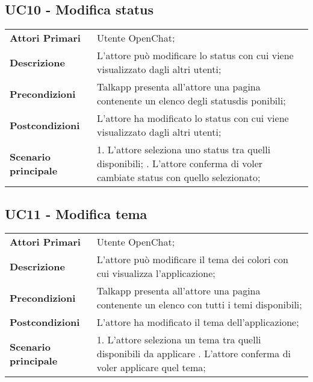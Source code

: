 \subsection{UC10 - Modifica status}
	\begin{center}
	\bgroup
	\def\arraystretch{1.8}     
	\begin{longtable}{  p{4cm} | p{9.5cm} } 
		\textbf{Attori Primari} & Utente OpenChat; \\ 
		\textbf{Descrizione} &  L'attore può modificare lo status con cui viene visualizzato dagli altri utenti; \\ 
		\textbf{Precondizioni}  & Talkapp presenta all'attore una pagina contenente un elenco degli statusdis ponibili; \\
		\textbf{Postcondizioni} & L'attore ha modificato lo status con cui viene visualizzato dagli altri utenti; \\ 
		\textbf{Scenario principale} & 
		1. L'attore seleziona uno status tra quelli disponibili; \newline
		2. L'attore conferma di voler cambiate status con quello selezionato;
	\end{longtable}
	\egroup
\end{center}

\subsection{UC11 - Modifica tema}
	\begin{center}
	\bgroup
	\def\arraystretch{1.8}     
	\begin{longtable}{  p{4cm} | p{9.5cm} } 
		\textbf{Attori Primari} & Utente OpenChat; \\ 
		\textbf{Descrizione} &  L'attore può modificare il tema dei colori con cui visualizza l'applicazione; \\ 
		\textbf{Precondizioni}  & Talkapp presenta all'attore una pagina contenente un elenco con tutti i temi disponibili; \\
		\textbf{Postcondizioni} & L'attore ha modificato il tema dell'applicazione; \\ 
		\textbf{Scenario principale} & 
		1. L'attore seleziona un tema tra quelli disponibili da applicare \newline
		2. L'attore conferma di voler applicare quel tema;
	\end{longtable}
	\egroup
\end{center}

